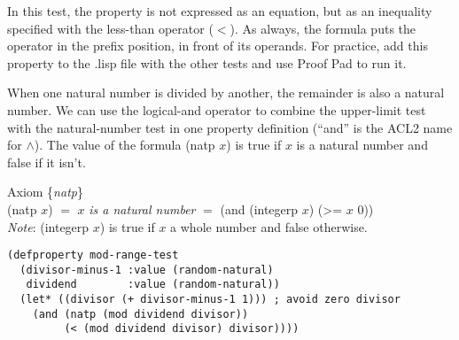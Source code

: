 In this test, the property is not expressed as an equation,
but as an inequality
specified with the less-than operator ($<$).
As always, the formula puts the operator in the prefix position,
in front of its operands.
For practice, add this property to the .lisp file with the other tests and
use Proof Pad to run it.

When one natural number is divided by another,
the remainder is also a natural number.
We can use the logical-and operator
to combine the upper-limit test with the natural-number test
in one property definition
(``\textsf{and}'' is the ACL2 name for $\wedge$).
\label{natp-op}The value of the formula
\textsf{(natp $x$)} is true
if $x$ is a natural number and false if it isn't.

\label{natp-axiom-formal}
\begin{center}
Axiom \{\emph{natp}\} \\
(natp $x$) $=$ $x$ \emph{is a natural number} $=$ \textsf{(and (integerp $x$) (>= $x$ 0))}\\
\emph{Note}: \textsf{(integerp $x$)} is true if $x$ a whole number and false otherwise.
\end{center}

\begin{Verbatim}
(defproperty mod-range-test
  (divisor-minus-1 :value (random-natural)
   dividend        :value (random-natural))
  (let* ((divisor (+ divisor-minus-1 1))) ; avoid zero divisor
    (and (natp (mod dividend divisor))
         (< (mod dividend divisor) divisor))))
\end{Verbatim}

